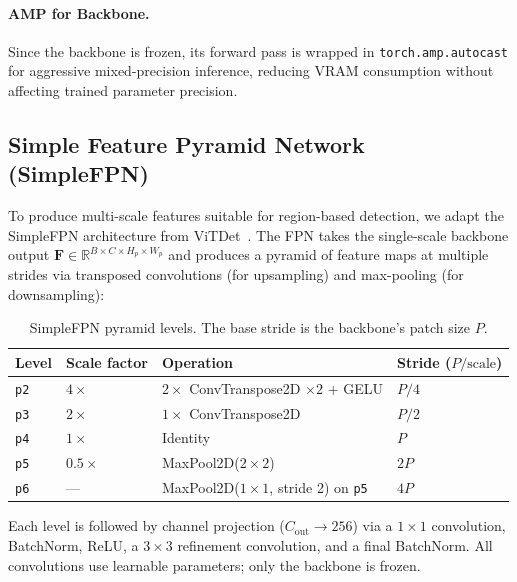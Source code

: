 \documentclass[runningheads]{llncs}
\newcommand{\mR}{\mathbb{R}}
\newcommand{\mat}[1]{\bm{#1}}
\begin{document}
\paragraph{AMP for Backbone.}  Since the backbone is frozen, its forward pass is wrapped in \texttt{torch.amp.autocast} for aggressive mixed-precision inference, reducing VRAM consumption without affecting trained parameter precision.


\subsection{Simple Feature Pyramid Network (SimpleFPN)}
\label{sec:fpn}

To produce multi-scale features suitable for region-based detection, we adapt the SimpleFPN architecture from ViTDet~\cite{li2022exploring}.  The FPN takes the single-scale backbone output $\mat{F} \in \mR^{B \times C \times H_p \times W_p}$ and produces a pyramid of feature maps at multiple strides via transposed convolutions (for upsampling) and max-pooling (for downsampling):

\begin{table}[h]
\centering
\caption{SimpleFPN pyramid levels.  The base stride is the backbone's patch size $P$.}
\label{tab:fpn_levels}
\small
\begin{tabular}{@{}llll@{}}
\toprule
\textbf{Level} & \textbf{Scale factor} & \textbf{Operation} & \textbf{Stride ($P / \text{scale}$)} \\
\midrule
\texttt{p2} & $4\times$ & $2\times$ ConvTranspose2D $\times 2$ + GELU     & $P/4$ \\
\texttt{p3} & $2\times$ & $1\times$ ConvTranspose2D                        & $P/2$ \\
\texttt{p4} & $1\times$ & Identity                                          & $P$   \\
\texttt{p5} & $0.5\times$ & MaxPool2D($2\times 2$)                          & $2P$  \\
\texttt{p6} & ---        & MaxPool2D($1\times 1$, stride 2) on \texttt{p5}  & $4P$  \\
\bottomrule
\end{tabular}
\end{table}

Each level is followed by channel projection ($C_{\text{out}} \to 256$) via a $1\times 1$ convolution, BatchNorm, ReLU, a $3\times 3$ refinement convolution, and a final BatchNorm.  All convolutions use learnable parameters; only the backbone is frozen.
\end{document}

